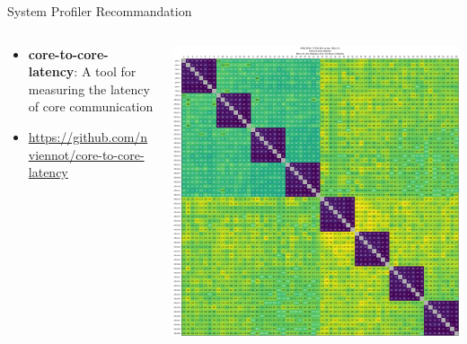 \begin{frame}{System Profiler Recommandation}
    \begin{columns}
        \begin{column}{0.5\textwidth}
            \begin{itemize}
                \item \textbf{core-to-core-latency}: A tool for measuring the latency of core communication
                \item \footnotesize{\url{https://github.com/nviennot/core-to-core-latency}}
            \end{itemize}
        \end{column}
        \begin{column}{0.5\textwidth}
            \centering
            \includegraphics[width=\textwidth]{img/core2core.png}
        \end{column}
    \end{columns}
\end{frame}

